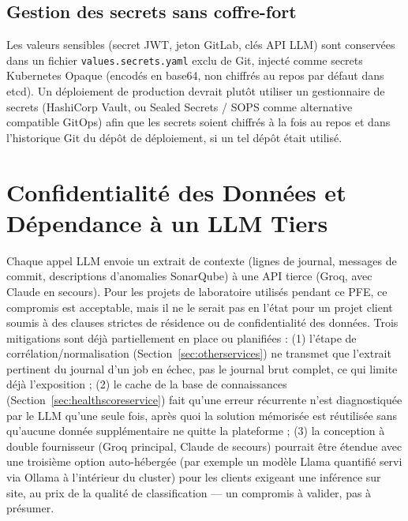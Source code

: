 \documentclass[12pt,a4paper,oneside]{report}
\begin{document}
\subsection{Gestion des secrets sans coffre-fort}
Les valeurs sensibles (secret JWT, jeton GitLab, clés API LLM) sont conservées dans un fichier \texttt{values.secrets.yaml} exclu de Git, injecté comme secrets Kubernetes Opaque (encodés en base64, non chiffrés au repos par défaut dans etcd). Un déploiement de production devrait plutôt utiliser un gestionnaire de secrets (HashiCorp Vault, ou Sealed Secrets / SOPS comme alternative compatible GitOps) afin que les secrets soient chiffrés à la fois au repos et dans l'historique Git du dépôt de déploiement, si un tel dépôt était utilisé.

\section{Confidentialité des Données et Dépendance à un LLM Tiers}
Chaque appel LLM envoie un extrait de contexte (lignes de journal, messages de commit, descriptions d'anomalies SonarQube) à une API tierce (Groq, avec Claude en secours). Pour les projets de laboratoire utilisés pendant ce PFE, ce compromis est acceptable, mais il ne le serait pas en l'état pour un projet client soumis à des clauses strictes de résidence ou de confidentialité des données. Trois mitigations sont déjà partiellement en place ou planifiées : (1) l'étape de corrélation/normalisation (Section~\ref{sec:otherservices}) ne transmet que l'extrait pertinent du journal d'un job en échec, pas le journal brut complet, ce qui limite déjà l'exposition ; (2) le cache de la base de connaissances (Section~\ref{sec:healthscoreservice}) fait qu'une erreur récurrente n'est diagnostiquée par le LLM qu'une seule fois, après quoi la solution mémorisée est réutilisée sans qu'aucune donnée supplémentaire ne quitte la plateforme ; (3) la conception à double fournisseur (Groq principal, Claude de secours) pourrait être étendue avec une troisième option auto-hébergée (par exemple un modèle Llama quantifié servi via Ollama à l'intérieur du cluster) pour les clients exigeant une inférence sur site, au prix de la qualité de classification --- un compromis à valider, pas à présumer.
\end{document}

